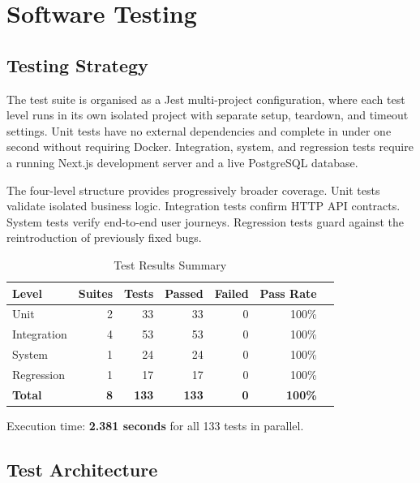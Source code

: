 \documentclass[12pt, a4paper]{article}
\begin{document}
\section{Software Testing}

\subsection{Testing Strategy}

The test suite is organised as a Jest multi-project configuration, where each test level runs in its own isolated project with separate setup, teardown, and timeout settings. Unit tests have no external dependencies and complete in under one second without requiring Docker. Integration, system, and regression tests require a running Next.js development server and a live PostgreSQL database.

The four-level structure provides progressively broader coverage. Unit tests validate isolated business logic. Integration tests confirm HTTP API contracts. System tests verify end-to-end user journeys. Regression tests guard against the reintroduction of previously fixed bugs.

\begin{table}[H]
\centering
\caption{Test Results Summary}
\begin{tabularx}{\textwidth}{lrrrrrr}
\toprule
\textbf{Level} & \textbf{Suites} & \textbf{Tests} & \textbf{Passed} & \textbf{Failed} & \textbf{Pass Rate} \\
\midrule
Unit        & 2 & 33  & 33  & 0 & 100\% \\
Integration & 4 & 53  & 53  & 0 & 100\% \\
System      & 1 & 24  & 24  & 0 & 100\% \\
Regression  & 1 & 17  & 17  & 0 & 100\% \\
\midrule
\textbf{Total} & \textbf{8} & \textbf{133} & \textbf{133} & \textbf{0} & \textbf{100\%} \\
\bottomrule
\end{tabularx}
\end{table}

Execution time: \textbf{2.381 seconds} for all 133 tests in parallel.

\subsection{Test Architecture}
\end{document}
